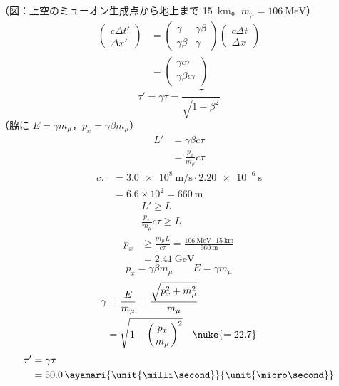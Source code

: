 （図：上空のミューオン生成点から地上まで \qty{15}{\kilo\metre}。$m_{\mu}=\qty{106}{\mega\electronvolt}$）
\begin{align*}
  \begin{pmatrix}c\Delta t'\\ \Delta x'\end{pmatrix}
  &=\begin{pmatrix}\gamma&\gamma\beta\\ \gamma\beta&\gamma\end{pmatrix}\begin{pmatrix}c\Delta t\\ \Delta x\end{pmatrix}\\
  &=\begin{pmatrix}\gamma c\tau\\ \gamma\beta c\tau\end{pmatrix}
\end{align*}
\[ \tau'=\gamma\tau=\frac{\tau}{\sqrt{1-\beta^{2}}} \]
（脇に $E=\gamma m_{\mu}$，$p_{x}=\gamma\beta m_{\mu}$）
\begin{align*}
  L'&=\gamma\beta c\tau\\
  &=\frac{p_{x}}{m_{\mu}}c\tau
\end{align*}
\begin{align*}
  c\tau&=\qty{3.0e8}{\metre\per\second}\cdot\qty{2.20e-6}{\second}\\
  &=6.6\times10^{2}=\qty{660}{\metre}
\end{align*}
\begin{align*}
  &L'\ge L\\
  &\frac{p_{x}}{m_{\mu}}c\tau\ge L\\
  p_{x}&\ge\frac{m_{\mu}L}{c\tau}=\frac{\qty{106}{\mega\electronvolt}\cdot\qty{15}{\kilo\metre}}{\qty{660}{\metre}}\\
  &=\qty{2.41}{\giga\electronvolt}
\end{align*}
\[ p_{x}=\gamma\beta m_{\mu}\qquad E=\gamma m_{\mu} \]
\begin{align*}
  \gamma&=\frac{E}{m_{\mu}}=\frac{\sqrt{p_{x}^{2}+m_{\mu}^{2}}}{m_{\mu}}\\
  &=\sqrt{1+\left(\frac{p_{x}}{m_{\mu}}\right)^{2}}\quad\nuke{=22.7}
\end{align*}
\begin{align*}
  \tau'&=\gamma\tau\\
  &=50.0\,\ayamari{\unit{\milli\second}}{\unit{\micro\second}}
\end{align*}
